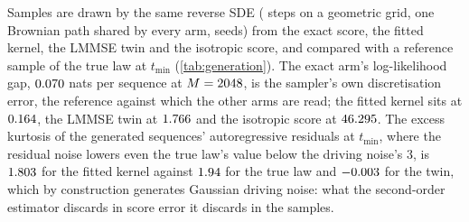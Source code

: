 Samples are drawn by the same reverse SDE (\genSteps{} steps on a geometric grid, one
Brownian path shared by every arm, \genSeeds{} seeds) from the exact score, the fitted
kernel, the LMMSE twin and the isotropic score, and compared with a reference sample of
the true law at $t_{\min}$ (\cref{tab:generation}). The exact arm's log-likelihood gap,
$0.070$ nats per sequence at $M=2048$, is the sampler's own discretisation
error, the reference against which the other arms are read; the fitted kernel sits at $0.164$, the LMMSE twin at
$1.766$ and the isotropic score at $46.295$. The excess kurtosis of the
generated sequences' autoregressive residuals at $t_{\min}$, where the residual noise
lowers even the true law's value below the driving noise's $3$, is $1.803$ for the
fitted kernel against $1.94$ for the true law and $-0.003$ for the twin, which by
construction generates Gaussian driving noise: what the second-order estimator discards in
score error it discards in the samples.
